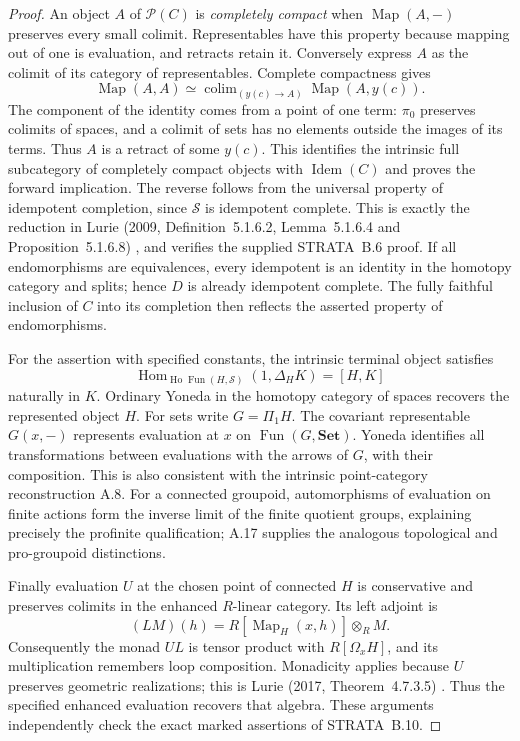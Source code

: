 \begin{proof}
An object $A$ of $\mathcal P(C)$ is \emph{completely compact} when
$\operatorname{Map}(A,-)$ preserves every small colimit. Representables
have this property because mapping out of one is evaluation, and
retracts retain it. Conversely express $A$ as the colimit of its
category of representables. Complete compactness gives
\[
 \operatorname{Map}(A,A)\simeq
    \mathop{\operatorname{colim}}_{(y(c)\to A)}
                       \operatorname{Map}(A,y(c)).
\]
The component of the identity comes from a point of one term:
$\pi_0$ preserves colimits of spaces, and a colimit of sets has no
elements outside the images of its terms. Thus $A$ is a retract of
some $y(c)$. This identifies the intrinsic full subcategory of
completely compact objects with $\operatorname{Idem}(C)$ and proves
the forward implication. The reverse follows from the universal
property of idempotent completion, since $\mathcal S$ is idempotent
complete. This is exactly the reduction in Lurie (2009,
Definition~5.1.6.2, Lemma~5.1.6.4 and Proposition~5.1.6.8)
\citep{FA_LurieHTT2009}, and verifies the supplied STRATA~B.6 proof.
If all endomorphisms are equivalences, every idempotent is an identity
in the homotopy category and splits; hence $D$ is already idempotent
complete. The fully faithful inclusion of $C$ into its completion
then reflects the asserted property of endomorphisms.

For the assertion with specified constants, the intrinsic terminal
object satisfies
\[
 \operatorname{Hom}_{\operatorname{Ho}\operatorname{Fun}(H,\mathcal S)}
                 (1,\Delta_H K)=[H,K]
                                                        \tag{E.15.2}
\]
naturally in $K$. Ordinary Yoneda in the homotopy category of spaces
recovers the represented object $H$. For sets write
$G=\Pi_1H$. The covariant representable $G(x,-)$ represents
evaluation at $x$ on $\operatorname{Fun}(G,\mathbf{Set})$.
Yoneda identifies all transformations between evaluations with the
arrows of $G$, with their composition. This is also consistent with
the intrinsic point-category reconstruction A.8. For a connected
groupoid, automorphisms of evaluation on finite actions form the
inverse limit of the finite quotient groups, explaining precisely
the profinite qualification; A.17 supplies the analogous topological
and pro-groupoid distinctions.

Finally evaluation $U$ at the chosen point of connected $H$ is
conservative and preserves colimits in the enhanced $R$-linear
category. Its left adjoint is
\[
 (LM)(h)=R[\operatorname{Map}_H(x,h)]\otimes_R M.
\]
Consequently the monad $UL$ is tensor product with $R[\Omega_xH]$,
and its multiplication remembers loop composition. Monadicity applies
because $U$ preserves geometric realizations; this is Lurie (2017,
Theorem~4.7.3.5) \citep{FA_LurieHA2017}. Thus the specified enhanced
evaluation recovers that algebra. These arguments independently check
the exact marked assertions of STRATA~B.10.
\end{proof}

